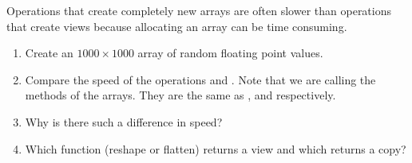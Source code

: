 \begin{problem} 
Operations that create completely new arrays are often slower than 
operations that create views because allocating an array can be time 
consuming. 
\begin{enumerate}
\item Create an $1000 \times 1000$ array  of random floating point values. 
\item Compare the speed of the operations 
and . Note that we are calling the methods of the arrays. 
They are the same as , and 
respectively. 
\item Why is there such a difference in speed? 
\item Which function (reshape or flatten) returns a view and which returns a copy?
\end{enumerate}
\end{problem}

